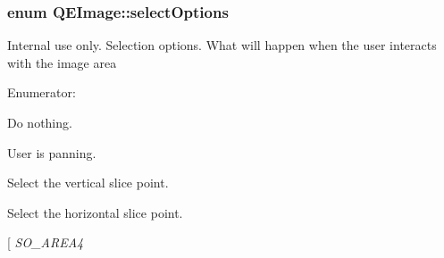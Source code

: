 \hypertarget{classQEImage_a2a0f3fb145abdf77229de456573b3360}{
\subsubsection[{selectOptions}]{\setlength{\rightskip}{0pt plus 5cm}enum {\bf QEImage::selectOptions}}}
\label{classQEImage_a2a0f3fb145abdf77229de456573b3360}
Internal use only. Selection options. What will happen when the user interacts with the image area \begin{Desc}
\item[Enumerator: ]\par
\begin{description}
\item[{\em 
\hypertarget{classQEImage_a2a0f3fb145abdf77229de456573b3360a125a0ed9e3738724031c61a072c0835a}{
SO\_\-NONE}
\label{classQEImage_a2a0f3fb145abdf77229de456573b3360a125a0ed9e3738724031c61a072c0835a}
}]Do nothing. \item[{\em 
\hypertarget{classQEImage_a2a0f3fb145abdf77229de456573b3360a338fb593947772abece0f1e69f97baad}{
SO\_\-PANNING}
\label{classQEImage_a2a0f3fb145abdf77229de456573b3360a338fb593947772abece0f1e69f97baad}
}]User is panning. \item[{\em 
\hypertarget{classQEImage_a2a0f3fb145abdf77229de456573b3360a7614d4cdf8d43a05e17595ab9804d849}{
SO\_\-VSLICE}
\label{classQEImage_a2a0f3fb145abdf77229de456573b3360a7614d4cdf8d43a05e17595ab9804d849}
}]Select the vertical slice point. \item[{\em 
\hypertarget{classQEImage_a2a0f3fb145abdf77229de456573b3360a452d2d6411e03be9642a9eb93c57ee06}{
SO\_\-HSLICE}
\label{classQEImage_a2a0f3fb145abdf77229de456573b3360a452d2d6411e03be9642a9eb93c57ee06}
}]Select the horizontal slice point. \item[{\em 
\hypertarget{classQEImage_a2a0f3fb145abdf77229de456573b3360a4efef95182ff85811f4c504e5bd04113}{
SO\_\-AREA4}
\label{classQEImage_a2a0f3fb145abdf77229de456573b3360a4efef95182ff85811f4c504e5bd04113}
}
\end{description}
\end{Desc}
